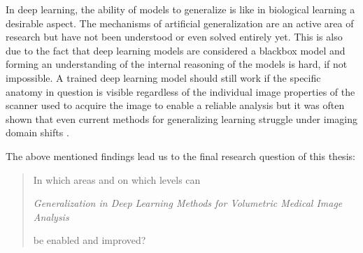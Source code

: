     In deep learning, the ability of models to generalize is like in biological learning a desirable aspect.
    The mechanisms of artificial generalization are an active area of research but have not been understood or even solved entirely yet.
    This is also due to the fact that deep learning models are considered a blackbox model and forming an understanding of the internal reasoning of the models is hard, if not impossible.
    A trained deep learning model should still work if the specific anatomy in question is visible regardless of the individual image properties of the scanner used to acquire the image to enable a reliable analysis but it was often shown that even current methods for generalizing learning struggle under imaging domain shifts \citep{ouyang2022causality}.

    The above mentioned findings lead us to the final research question of this thesis:

    \begin{quote}
        \centering \Large
        In which areas and on which levels can

        \noindent \emph{Generalization in Deep Learning Methods for Volumetric Medical Image Analysis}

        \noindent be enabled and improved?
    \end{quote}





